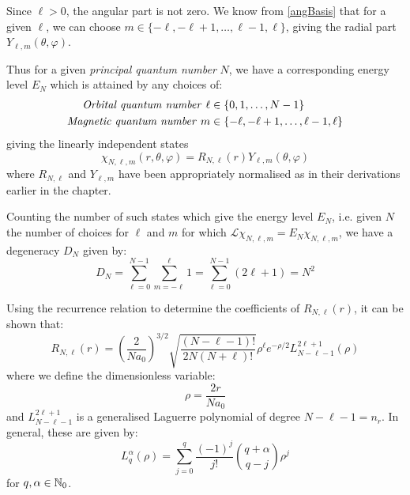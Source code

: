 \documentclass[../main.tex]{subfiles}
\begin{document}
Since $\ell > 0$, the angular part is not zero. We know from \cref{angBasis} that for a given $\ell$, we can choose $m \in \{-\ell, - \ell + 1, \ldots, \ell - 1, \ell\}$, giving the radial part $Y_{\ell, m}(\theta, \varphi)$.

Thus for a given \textit{principal quantum number} $N$, we have a corresponding energy level $E_N$ which is attained by any choices of:
\begin{align*}
  \text{\textit{Orbital quantum number} } \ell &\in \{0, 1, \ldots, N - 1\} \\
  \text{\textit{Magnetic quantum number} } m &\in \{-\ell, -\ell + 1, \ldots, \ell - 1, \ell\}
\end{align*}
giving the linearly independent states
\[
  \chi_{N, \ell, m}(r, \theta, \varphi) = R_{N, \ell}(r) Y_{\ell, m}(\theta, \varphi)
\]
where $R_{N, \ell}$ and $Y_{\ell, m}$ have been appropriately normalised as in their derivations earlier in the chapter.

Counting the number of such states which give the energy level $E_N$, i.e. given $N$ the number of choices for $\ell$ and $m$ for which $\mathcal{L}\chi_{N, \ell, m} = E_N \chi_{N, \ell, m}$, we have a degeneracy $D_N$ given by:
\[
  D_N = \sum_{\ell = 0}^{N - 1} \sum_{m = -\ell}^{\ell} 1  = \sum_{\ell = 0}^{N - 1} (2\ell + 1) = N^2
\]

Using the recurrence relation to determine the coefficients of $R_{N, \ell}(r)$, it can be shown that:
\[
  R_{N, \ell}(r) = \left(\frac{2}{Na_0}\right)^{3/2} \sqrt{\frac{(N - \ell - 1)!}{2N(N + \ell)!}} \rho^{\ell} e^{-\rho/2} L^{2\ell + 1}_{N - \ell - 1}(\rho)
\]
where we define the dimensionless variable:
\[
  \rho = \frac{2r}{Na_0}
\]
and $L^{2\ell + 1}_{N - \ell - 1}$ is a generalised Laguerre polynomial of degree $N - \ell - 1 = n_r$.
In general, these are given by:
\[
  L^{\alpha}_{q}(\rho) = \sum_{j = 0}^{q} \frac{(-1)^{j}}{j!} \binom{q + \alpha}{q - j} \rho^{j}
\]
for $q, \alpha \in \mathbb{N}_0$.
\end{document}

